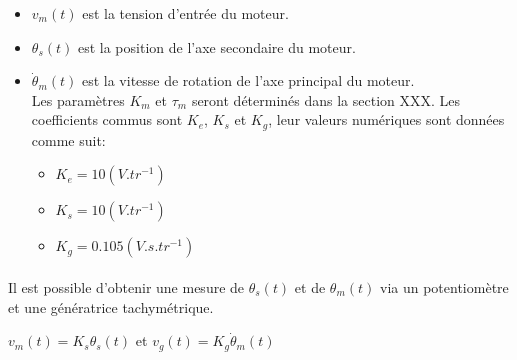 	\begin{itemize} [label=,font=\small \color{black}]
	\item $v_{m}(t)$\hspace{1mm} est la tension d'entrée du moteur.
	\item $\theta_{s}(t)$\hspace{1mm} est la position de l'axe secondaire du moteur.
	\item $\dot{\theta}_{m}(t)$ est la vitesse de rotation de l'axe principal du moteur.\\
	Les paramètres $K_{m}$ et $\tau_{m}$ seront déterminés dans la section XXX. Les coefficients commus sont $K_{e}$, $K_{s}$ et $K_{g}$, leur valeurs numériques sont données comme suit:
	\begin{itemize} [label=,font=\small \color{black}]
	\item $K_{e} = 10(V.tr^{-1})$
	\item $K_{s} = 10(V.tr^{-1})$
	\item $K_{g} = 0.105(V.s.tr^{-1})$
	\end{itemize}
	\end{itemize}
	
	\paragraph{}
		Il est possible d’obtenir une mesure de $\theta_{s}(t)$ et de $\theta_{m}(t)$ via un potentiomètre et une génératrice tachymétrique.
		
		\begin{center}
		$v_{m}(t) = K_{s}\theta_{s}(t)$ \hspace{1.5cm} et \hspace{1.5cm} $v_{g}(t) = K_{g}\dot{\theta}_{m}(t)$ 
		\end{center}
		